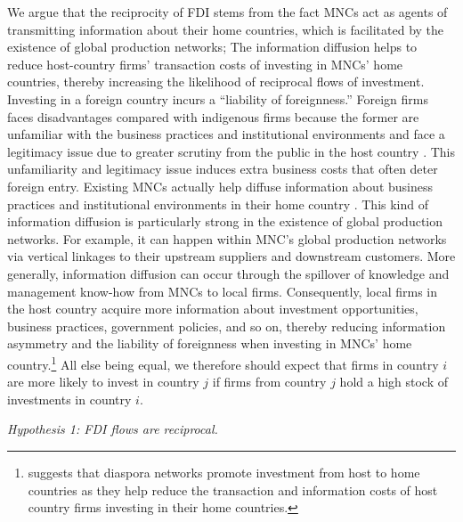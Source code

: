 \documentclass[reqno,onecolumn,letterpaper,12pt]{article}
\begin{document}
We argue that the reciprocity of FDI stems from the fact %
MNCs act as agents of transmitting information about their home countries, which is facilitated by the existence of global production networks; The information diffusion helps to reduce host-country firms' transaction costs of investing in MNCs' home countries, thereby increasing the likelihood of reciprocal flows of investment. Investing in a foreign country incurs a ``liability of foreignness.'' Foreign firms faces disadvantages compared with indigenous firms because the former are unfamiliar with the business practices and institutional environments and face a legitimacy issue due to greater scrutiny from the public in the host country \citep{Zaheer:1995,Kostova_Zaheer:1999,Hymer:1976}. This unfamiliarity and legitimacy issue induces extra business costs that often deter foreign entry. Existing MNCs actually help diffuse information about business practices and institutional environments in their home country \citep{Kwok_Tadesse:2006,Sandholtz_Gray:2003,Simmons_Elkins:2004}. This kind of information diffusion is particularly strong in the existence of global production networks. For example, it can happen within MNC's global production networks via vertical linkages to their upstream suppliers and downstream customers. More generally, information diffusion can occur through the spillover of knowledge and management know-how from MNCs to local firms. Consequently, local firms in the host country acquire more information about investment opportunities, business practices, government policies, and so on, thereby reducing information asymmetry and the liability of foreignness when investing in MNCs' home country.\footnote{\citet{Leblang:2010} suggests that diaspora networks promote investment from host to home countries as they help reduce the transaction and information costs of host country firms investing in their home countries.} All else being equal, we therefore should expect that firms in country $i$ are more likely to invest in country $j$ if firms from country $j$ hold a high stock of investments in country $i$.


\begin{center}
\textit{Hypothesis 1: FDI flows are reciprocal.}
\end{center}
\end{document}
